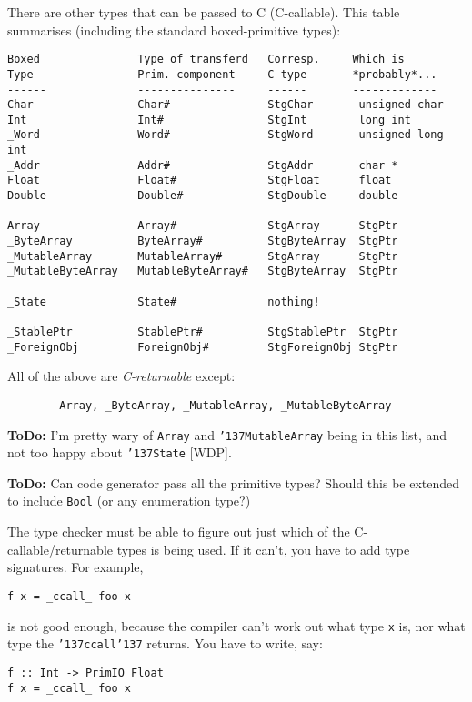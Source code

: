 There are other types that can be passed to C (C-callable).  This
table summarises (including the standard boxed-primitive types):
\begin{verbatim}
Boxed               Type of transferd   Corresp.     Which is
Type                Prim. component     C type       *probably*...
------              ---------------     ------       -------------
Char                Char#               StgChar       unsigned char
Int                 Int#                StgInt        long int
_Word               Word#               StgWord       unsigned long int
_Addr               Addr#               StgAddr       char *
Float               Float#              StgFloat      float
Double              Double#             StgDouble     double

Array               Array#              StgArray      StgPtr
_ByteArray          ByteArray#          StgByteArray  StgPtr
_MutableArray       MutableArray#       StgArray      StgPtr
_MutableByteArray   MutableByteArray#   StgByteArray  StgPtr

_State              State#              nothing!

_StablePtr          StablePtr#          StgStablePtr  StgPtr
_ForeignObj         ForeignObj#         StgForeignObj StgPtr
\end{verbatim}

All of the above are {\em C-returnable} except:
\begin{verbatim}
        Array, _ByteArray, _MutableArray, _MutableByteArray
\end{verbatim}

{\bf ToDo:} I'm pretty wary of \mbox{\tt Array} and \mbox{\tt {\char'137}MutableArray} being in
this list, and not too happy about \mbox{\tt {\char'137}State} [WDP].

{\bf ToDo:} Can code generator pass all the primitive types?  Should this be
extended to include {\tt Bool\/} (or any enumeration type?)

The type checker must be able to figure out just which of the C-callable/returnable
types is being used.  If it can't, you have to add type signatures. For example,
\begin{verbatim}
f x = _ccall_ foo x
\end{verbatim}
is not good enough, because the compiler can't work out what type \mbox{\tt x} is, nor 
what type the \mbox{\tt {\char'137}ccall{\char'137}} returns.  You have to write, say:
\begin{verbatim}
f :: Int -> PrimIO Float
f x = _ccall_ foo x
\end{verbatim}

